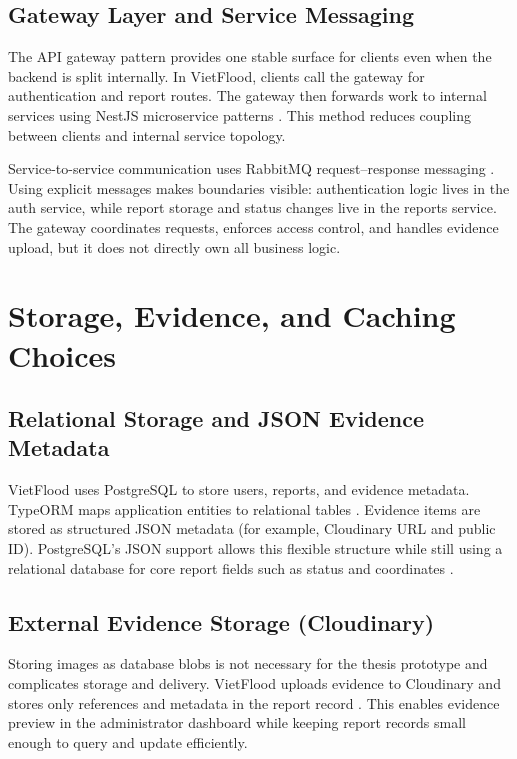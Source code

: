 \subsection{Gateway Layer and Service Messaging}

The API gateway pattern provides one stable surface for clients even when the backend is split internally. In VietFlood, clients call the gateway for authentication and report routes. The gateway then forwards work to internal services using NestJS microservice patterns \cite{nestjsDocs,nestjsMicroservicesDocs}. This method reduces coupling between clients and internal service topology.

Service-to-service communication uses RabbitMQ request--response messaging \cite{rabbitmqConfirmsDocs}. Using explicit messages makes boundaries visible: authentication logic lives in the auth service, while report storage and status changes live in the reports service. The gateway coordinates requests, enforces access control, and handles evidence upload, but it does not directly own all business logic.

\section{Storage, Evidence, and Caching Choices}

\subsection{Relational Storage and JSON Evidence Metadata}

VietFlood uses PostgreSQL to store users, reports, and evidence metadata. TypeORM maps application entities to relational tables \cite{typeormDocs}. Evidence items are stored as structured JSON metadata (for example, Cloudinary URL and public ID). PostgreSQL's JSON support allows this flexible structure while still using a relational database for core report fields such as status and coordinates \cite{postgresqlJsonDocs}.

\subsection{External Evidence Storage (Cloudinary)}

Storing images as database blobs is not necessary for the thesis prototype and complicates storage and delivery. VietFlood uploads evidence to Cloudinary and stores only references and metadata in the report record \cite{cloudinaryUploadDocs}. This enables evidence preview in the administrator dashboard while keeping report records small enough to query and update efficiently.

